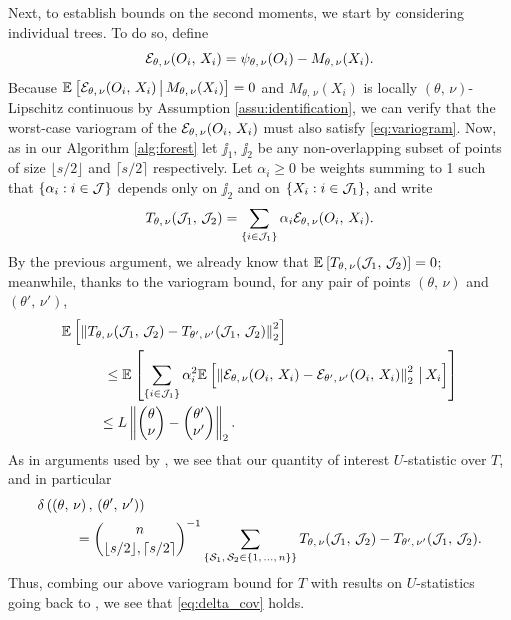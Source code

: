 \documentclass[aos]{imsart}
\theoremstyle{plain}
\theoremstyle{definition}
\theoremstyle{remark}
\begin{document}
\begin{CJK}{UTF8}{gbsn}
{\begin{appendix}
Next, to establish bounds on the second moments, we start by considering individual
trees. To do so, define
$$ \mathcal{E}_{\theta, \, \nu}(O_i,\, X_i) = \psi_{\theta, \, \nu}(O_i) - M_{\theta, \, \nu}(X_i). $$
Because $\mathbb{E}_{}\left[\mathcal{E}_{\theta, \, \nu}(O_i,\, X_i) \,\big|\, M_{\theta, \, \nu}(X_i)\right] = 0$ and $M_{\theta, \, \nu}(X_i)$
is locally $(\theta, \, \nu)$-Lipschitz continuous by Assumption \ref{assu:identification}, we can verify
that the worst-case variogram of the $\mathcal{E}_{\theta, \, \nu}(O_i,\, X_i)$ must also satisfy \eqref{eq:variogram}.
Now, as in our Algorithm \ref{alg:forest}  let $\jj_1, \, \jj_2$ be any
non-overlapping subset of points of size $\lfloor s/2 \rfloor$ and $\lceil s/2 \rceil$ respectively.
Let $\alpha_i \geq 0$ be weights summing to 1 such that
$\left\{\alpha_i : i \in \mathcal{J}\right\}$ depends only on $\jj_2$ and on $\left\{X_i : i \in \mathcal{J}_1\right\}$, and write
$$ T_{\theta, \, \nu}(\mathcal{J}_1, \, \mathcal{J}_2) = \sum_{\left\{i \in \mathcal{J}_1\right\}} \alpha_i \mathcal{E}_{\theta, \, \nu}(O_i,\, X_i). $$
By the previous argument, we already know that $\mathbb{E}_{}\left[T_{\theta, \, \nu}(\mathcal{J}_1, \, \mathcal{J}_2)\right] = 0$;
meanwhile, thanks to the variogram bound, for any pair of points
$(\theta, \, \nu)$ and $(\theta', \, \nu')$,
\begin{equation}
\label{eq:tree_variogram}
\begin{split}
&\EE{\Norm{T_{\theta, \, \nu}(\jj_1, \, \jj_2) - T_{\theta', \, \nu'}(\jj_1, \, \jj_2)}_2^2} \\
&\ \ \ \ \ \ \ \ \ \leq \EE{\sum_{\cb{i \in \jj_1}} \alpha_i^2 \EE{\Norm{\ecal_{\theta, \, \nu}(O_i,\, X_i) - \ecal_{\theta', \, \nu'}(O_i,\, X_i)}_2^2 \cond X_i}}  \\
& \ \ \ \ \ \ \ \ \leq L \Norm{\begin{pmatrix} \theta \\ \nu \end{pmatrix} -  \begin{pmatrix} \theta' \\ \nu' \end{pmatrix}}_2.
\end{split}
\end{equation}
As in arguments used by \citet{wager2015estimation}, we see that
our quantity of interest $U$-statistic over $T$, and in particular
\begin{align*}
&\delta\p{\p{\theta, \, \nu}, \, \p{\theta', \, \nu'}} \\
&\ \ \ \ \ \ \ \ = \binom{n}{\lfloor s/2 \rfloor, \lceil s/2 \rceil}^{-1} \sum_{\cb{\set_1, \, \set_2 \in \cb{1, \, ..., \, n}}} T_{\theta, \, \nu}(\jj_1, \, \jj_2) - T_{\theta', \, \nu'}(\jj_1, \, \jj_2). 
\end{align*}
Thus, combing our above variogram bound for $T$ with results on $U$-statistics
going back to \citet{hoeffding1948class}, we see that \eqref{eq:delta_cov} holds.


\end{appendix}}
\end{CJK}
\end{document}
